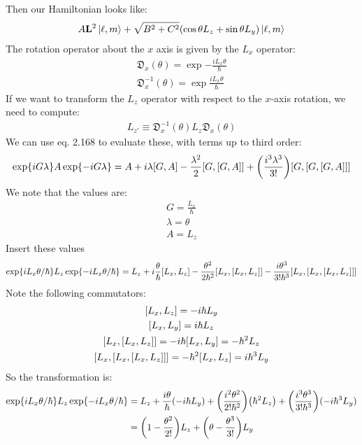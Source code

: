 \documentclass[12pt]{article}
\renewcommand{\l}{\ell}
\begin{document}
Then our Hamiltonian looks like:
\begin{align*}
  A\vb{L}^2\ket{\l,m}+\sqrt{B^2+C^2}(\cos\theta L_z+\sin\theta L_y)\ket{\l,m}
\end{align*}
The rotation operator about the $x$ axis is given by the $L_x$ operator:
\begin{align*}
  \mathfrak{D}_x(\theta)=\exp{-\frac{iL_x\theta}{\hbar}}\\
  \mathfrak{D}_x^{-1}(\theta)=\exp{\frac{iL_x\theta}{\hbar}}
\end{align*}
If we want to transform the $L_z$ operator with respect to the $x$-axis rotation, we need to compute:
\begin{align*}
  L_{z'}\equiv\mathfrak{D}_x^{-1}(\theta)L_z\mathfrak{D}_x(\theta)
\end{align*}
We can use eq. 2.168 to evaluate these, with terms up to third order:
\begin{align*}
  \exp{iG\lambda} A \exp{-iG\lambda}=
  A+i\lambda\comm{G}{A}-\frac{\lambda^2}{2}\comm{G}{\comm{G}{A}}
  +\qty(\frac{i^3\lambda^3}{3!})\comm{G}{\comm{G}{\comm{G}{A}}}
\end{align*}
We note that the values are:
\begin{gather*}
  G=\frac{L_x}{\hbar}\\
  \lambda=\theta\\
  A=L_{z}
\end{gather*}
Insert these values
\begin{align*}
  \exp{iL_x\theta/\hbar} L_z \exp{-iL_x\theta/\hbar}=
  L_z+i\frac{\theta}{\hbar}\comm{L_x}{L_z}
  -\frac{\theta^2}{2\hbar^2}\comm{L_x}{\comm{L_x}{L_z}}
  -\frac{i\theta^3}{3!\hbar^3}\comm{L_x}{\comm{L_x}{\comm{L_x}{L_z}}}
\end{align*}
Note the following commutators:
\begin{gather*}
  \comm{L_x}{L_z} = -i\hbar L_y\\
  \comm{L_x}{L_y} = i\hbar L_z\\
  \comm{L_x}{\comm{L_x}{L_z}} = -i\hbar\comm{L_x}{L_y}=-\hbar^2L_z\\
  \comm{L_x}{\comm{L_x}{\comm{L_x}{L_z}}} = -\hbar^2\comm{L_x}{L_z}=i\hbar^3L_y
\end{gather*}
So the transformation is:
\begin{align*}
  \exp{iL_x\theta/\hbar} L_z \exp{-iL_x\theta/\hbar}&=
  L_z+\frac{i\theta}{\hbar}\qty(-i\hbar L_y)
  +\qty(\frac{i^2\theta^2}{2!\hbar^2})\qty(\hbar^2L_z)
  +\qty(\frac{i^3\theta^3}{3!\hbar^3})(-i\hbar^3L_y)\\
  &=\qty(1-\frac{\theta^2}{2!})L_z+\qty(\theta-\frac{\theta^3}{3!})L_y
\end{align*}
\end{document}
